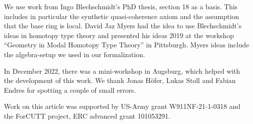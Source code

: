 We use work from Ingo Blechschmidt's PhD thesis, section 18 as a basis.
This includes in particular the synthetic quasi-coherence axiom and the assumption that the base ring is local.
David Jaz Myers had the idea to use Blechschmidt's ideas in homotopy type theory
and presented his ideas 2019 at the workshop ``Geometry in Modal Homotopy Type Theory'' in Pittsburgh.
Myers ideas include the algebra-setup we used in our formalization.

In December 2022, there was a mini-workshop in Augsburg, which helped with the development of this work.
We thank Jonas Höfer, Lukas Stoll and Fabian Endres for spotting a couple of small errors.

Work on this article was supported by US-Army grant W911NF-21-1-0318 and the ForCUTT project, ERC advanced grant 101053291.

